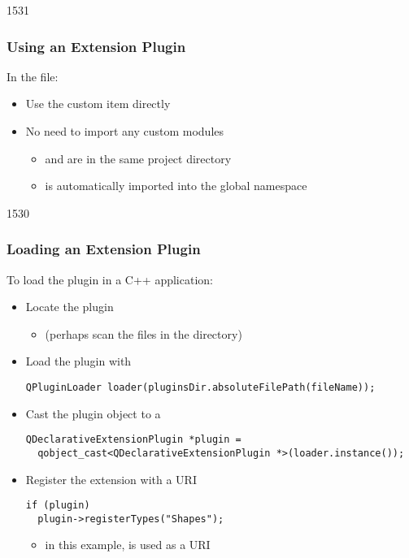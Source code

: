 \begin{slide}[fragile]{1531}\frametitle{Using an Extension Plugin}

In the  file:

\vspace*{0.5em}

\vspace*{0.5em}
\begin{itemize}
\item Use the custom item directly
\item No need to import any custom modules
  \begin{itemize}
  \item {} and  are in the same project
        directory
  \item {} is automatically imported into the global namespace
  \end{itemize}
\end{itemize}


\end{slide}

\begin{slide}[fragile]{1530}\frametitle{Loading an Extension Plugin}

To load the plugin in a C++ application:

\begin{itemize}
\item Locate the plugin
  \begin{itemize}
  \item (perhaps scan the files in the  directory)
  \end{itemize}
\item Load the plugin with 
\begin{lstlisting}
QPluginLoader loader(pluginsDir.absoluteFilePath(fileName));
\end{lstlisting}
\vspace*{0.5em}
\item Cast the plugin object to a 
\begin{lstlisting}
QDeclarativeExtensionPlugin *plugin =
  qobject_cast<QDeclarativeExtensionPlugin *>(loader.instance());
\end{lstlisting}
\vspace*{0.5em}
\item Register the extension with a URI
\begin{lstlisting}
if (plugin)
  plugin->registerTypes("Shapes");
\end{lstlisting}
  \begin{itemize}
  \item in this example,  is used as a URI
  \end{itemize}
\end{itemize}

\end{slide}

